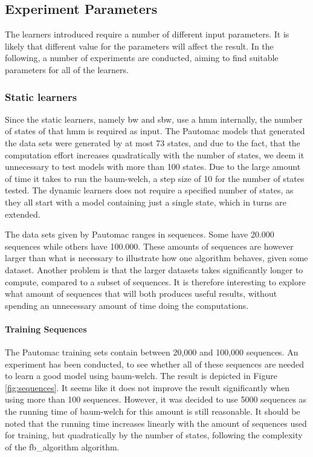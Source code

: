 \subsection{Experiment Parameters}\label{sec:parameters}
The learners introduced require a number of different input parameters. It is likely that different value for the parameters will affect the result. In the following, a number of experiments are conducted, aiming to find suitable parameters for all of the learners. 

\subsubsection{Static learners}
Since the static learners, namely \gls{bw} and \gls{sbw}, use a \gls{hmm} internally, the number of states of that \gls{hmm} is required as input.
The Pautomac models that generated the data sets were generated by at most 73 states, and due to the fact, that the computation effort increases quadratically with the number of states, we deem it unnecessary to test models with more than 100 states. Due to the large amount of time it takes to run the \gls{baum-welch}, a step size of 10 for the number of states tested.
The dynamic learners does not require a specified number of states, as they all start with a model containing just a single state, which in turns are extended.

The data sets given by Pautomac ranges in sequences. Some have 20.000 sequences while others have 100.000. These amounts of sequences are however larger than what is necessary to illustrate how one algorithm behaves, given some dataset. Another problem is that the larger datasets takes significantly longer to compute, compared to a subset of sequences. It is therefore interesting to explore what amount of sequences that will both produces useful results, without spending an unnecessary amount of time doing the computations.

\paragraph{Training Sequences}
The Pautomac training sets contain between 20,000 and 100,000 sequences.
An experiment has been conducted, to see whether all of these sequences are needed to learn a good model using \gls{baum-welch}.
The result is depicted in Figure \ref{fig:sequences}. It seems like it does not improve the result significantly when using more than 100 sequences.
However, it was decided to use 5000 sequences as the running time of \gls{baum-welch} for this amount is still reasonable. It should be noted that the running time increases linearly with the amount of sequences used for training, but quadratically by the number of states, following the complexity of the \gls{fb_algorithm} algorithm.

